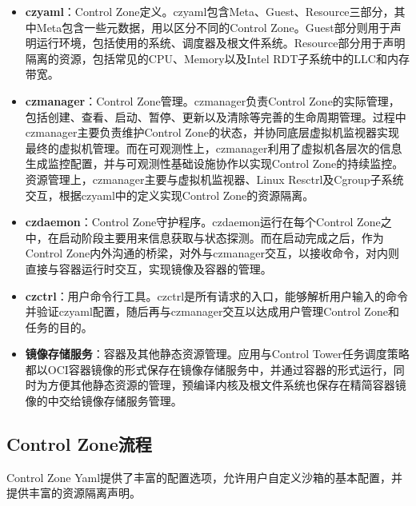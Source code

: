 \begin{itemize}
    \item \textbf{czyaml}：Control Zone定义。czyaml包含Meta、Guest、Resource三部分，其中Meta包含一些元数据，用以区分不同的Control Zone。Guest部分则用于声明运行环境，包括使用的系统、调度器及根文件系统。Resource部分用于声明隔离的资源，包括常见的CPU、Memory以及Intel RDT子系统中的LLC和内存带宽。
    \item \textbf{czmanager}：Control Zone管理。czmanager负责Control Zone的实际管理， 包括创建、查看、启动、暂停、更新以及清除等完善的生命周期管理。过程中czmanager主要负责维护Control Zone的状态，并协同底层虚拟机监视器实现最终的虚拟机管理。而在可观测性上，czmanager利用了虚拟机各层次的信息生成监控配置，并与可观测性基础设施协作以实现Control Zone的持续监控。资源管理上，czmanager主要与虚拟机监视器、Linux Resctrl及Cgroup子系统交互，根据czyaml中的定义实现Control Zone的资源隔离。
    \item \textbf{czdaemon}：Control Zone守护程序。czdaemon运行在每个Control Zone之中，在启动阶段主要用来信息获取与状态探测。而在启动完成之后，作为Control Zone内外沟通的桥梁，对外与czmanager交互，以接收命令，对内则直接与容器运行时交互，实现镜像及容器的管理。
    \item \textbf{czctrl}：用户命令行工具。czctrl是所有请求的入口，能够解析用户输入的命令并验证czyaml配置，随后再与czmanager交互以达成用户管理Control Zone和任务的目的。
    \item \textbf{镜像存储服务}：容器及其他静态资源管理。应用与Control Tower任务调度策略都以OCI容器镜像的形式保存在镜像存储服务中，并通过容器的形式运行，同时为方便其他静态资源的管理，预编译内核及根文件系统也保存在精简容器镜像的中交给镜像存储服务管理。
\end{itemize}

\subsection{Control Zone流程}



Control Zone Yaml提供了丰富的配置选项，允许用户自定义沙箱的基本配置，并提供丰富的资源隔离声明。

